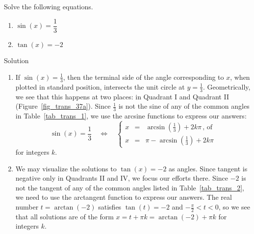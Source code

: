 \begin{example}  \label{basicinverseeqns}  Solve the following equations.
	
	\begin{multicols}{2}
		
		\begin{enumerate}
			
			\item  $\sin(x) = \dfrac{1}{3}$
			
			\item $\tan(x) = -2$
		\end{enumerate}
	\end{multicols}
	
	
	Solution 
	
	\begin{enumerate}
		
		\item  If $\sin(x) = \frac{1}{3}$, then the terminal side of the angle corresponding to $x$, when plotted in standard position, intersects the unit circle at $y = \frac{1}{3}$.  Geometrically, we see that this happens at two places:  in Quadrant I and Quadrant II (Figure~\ref{fig_trans_37a}). Since $\frac{1}{3}$ is not the sine of any of the common angles in Table~\ref{tab_trans_1}, we use the arcsine functions to express our answers:
		$$
\sin(x)=\dfrac{1}{3}\quad\Leftrightarrow\quad \left\{\begin{array}{rcl}
     x&=&\arcsin\left(\frac{1}{3}\right)+2k\pi\,\text{, of}  \\[0.2cm]
     x&=&\pi-\arcsin\left(\frac{1}{3}\right)+2k\pi 
\end{array}\right.
$$
for integers $k$.
		
		\item We may visualize the solutions to $\tan(x)=-2$ as angles.  Since tangent is negative only in Quadrants II and IV, we focus our efforts there. Since $-2$ is not the tangent of any of the common angles listed in Table~\ref{tab_trans_2}, we need to use the arctangent function to express our answers.  The real number $t = \arctan(-2)$ satisfies $\tan(t)=-2$  and $-\frac{\pi}{2} < t < 0$, so we see that all solutions are of the form $x = t + \pi k = \arctan(-2) + \pi k$ for integers $k$. 
		
	\end{enumerate}
	

\end{example}
